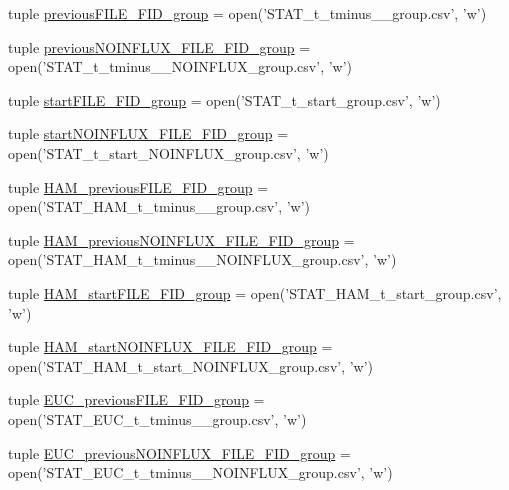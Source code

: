 \begin{DoxyCompactItemize}
\item 
tuple \hyperlink{a00130_a9e72c152be1f5aac24af10b353b16390}{previous\-F\-I\-L\-E\-\_\-\-F\-I\-D\-\_\-group} = open('S\-T\-A\-T\-\_\-t\-\_\-tminus\-\_\-\_\-group.\-csv', 'w')
\item 
tuple \hyperlink{a00130_a648b56a19ba8992cdb56d307ed22eb41}{previous\-N\-O\-I\-N\-F\-L\-U\-X\-\_\-\-F\-I\-L\-E\-\_\-\-F\-I\-D\-\_\-group} = open('S\-T\-A\-T\-\_\-t\-\_\-tminus\-\_\-\_\-\-N\-O\-I\-N\-F\-L\-U\-X\-\_\-group.\-csv', 'w')
\item 
tuple \hyperlink{a00130_addede16e21598cc53c446efa66bd20d9}{start\-F\-I\-L\-E\-\_\-\-F\-I\-D\-\_\-group} = open('S\-T\-A\-T\-\_\-t\-\_\-start\-\_\-group.\-csv', 'w')
\item 
tuple \hyperlink{a00130_a14eebfeaac72a017ee76d69b55033042}{start\-N\-O\-I\-N\-F\-L\-U\-X\-\_\-\-F\-I\-L\-E\-\_\-\-F\-I\-D\-\_\-group} = open('S\-T\-A\-T\-\_\-t\-\_\-start\-\_\-\-N\-O\-I\-N\-F\-L\-U\-X\-\_\-group.\-csv', 'w')
\item 
tuple \hyperlink{a00130_aa72272e636b1eafe39ed3367145433f2}{H\-A\-M\-\_\-previous\-F\-I\-L\-E\-\_\-\-F\-I\-D\-\_\-group} = open('S\-T\-A\-T\-\_\-\-H\-A\-M\-\_\-t\-\_\-tminus\-\_\-\_\-group.\-csv', 'w')
\item 
tuple \hyperlink{a00130_a092676cc95ddff57aac2aa077ce22d52}{H\-A\-M\-\_\-previous\-N\-O\-I\-N\-F\-L\-U\-X\-\_\-\-F\-I\-L\-E\-\_\-\-F\-I\-D\-\_\-group} = open('S\-T\-A\-T\-\_\-\-H\-A\-M\-\_\-t\-\_\-tminus\-\_\-\_\-\-N\-O\-I\-N\-F\-L\-U\-X\-\_\-group.\-csv', 'w')
\item 
tuple \hyperlink{a00130_ab74ecb2bab6a84c44274814862f2e96c}{H\-A\-M\-\_\-start\-F\-I\-L\-E\-\_\-\-F\-I\-D\-\_\-group} = open('S\-T\-A\-T\-\_\-\-H\-A\-M\-\_\-t\-\_\-start\-\_\-group.\-csv', 'w')
\item 
tuple \hyperlink{a00130_a4652c6dad393663e40970d7f6422c1d6}{H\-A\-M\-\_\-start\-N\-O\-I\-N\-F\-L\-U\-X\-\_\-\-F\-I\-L\-E\-\_\-\-F\-I\-D\-\_\-group} = open('S\-T\-A\-T\-\_\-\-H\-A\-M\-\_\-t\-\_\-start\-\_\-\-N\-O\-I\-N\-F\-L\-U\-X\-\_\-group.\-csv', 'w')
\item 
tuple \hyperlink{a00130_adf079c2d443f89f00a330a58f99c2095}{E\-U\-C\-\_\-previous\-F\-I\-L\-E\-\_\-\-F\-I\-D\-\_\-group} = open('S\-T\-A\-T\-\_\-\-E\-U\-C\-\_\-t\-\_\-tminus\-\_\-\_\-group.\-csv', 'w')
\item 
tuple \hyperlink{a00130_ace5cf628b305f9110e058d7dafd27fb4}{E\-U\-C\-\_\-previous\-N\-O\-I\-N\-F\-L\-U\-X\-\_\-\-F\-I\-L\-E\-\_\-\-F\-I\-D\-\_\-group} = open('S\-T\-A\-T\-\_\-\-E\-U\-C\-\_\-t\-\_\-tminus\-\_\-\_\-\-N\-O\-I\-N\-F\-L\-U\-X\-\_\-group.\-csv', 'w')

\end{DoxyCompactItemize}
